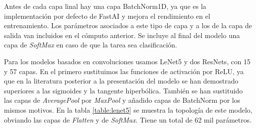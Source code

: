 Antes de cada capa linal hay una capa BatchNorm1D, ya que es la implementación por defecto de FastAI y mejora el rendimiento en el entrenamiento. Los parámetros asociados a este tipo de capa y a los de la capa de salida van incluidos en el cómputo anterior. Se incluye al final del modelo una capa de \textit{SoftMax} en caso de que la tarea sea clasificación.

Para los modelos basados en convoluciones usamos LeNet5 y dos ResNets, con 15 y 57 capas. En el primero sustituimos las funciones de activación por ReLU, ya que en la literatura posterior a la presentación del modelo se han demostrado superiores a las sigmoides y la tangente hiperbólica. También se han sustituido las capas de \textit{AveragePool} por \textit{MaxPool} y añadido capas de BatchNorm por los mismos motivos. En la tabla \ref{table:lenet5} se muestra la topología de este modelo, obviando las capas de \textit{Flatten} y de \textit{SoftMax}. Tiene un total de 62 mil parámetros.



